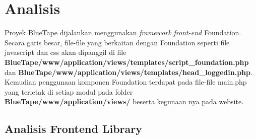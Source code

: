 

\chapter{Analisis}
Proyek BlueTape dijalankan menggunakan \textit{framework front-end}  Foundation. Secara garis besar, file-file yang berkaitan dengan Foundation seperti file javascript dan css akan dipanggil di file \textbf{BlueTape/www/application/views/templates/script{\_}foundation.php} dan \textbf{BlueTape/www/application/views/templates/head{\_}loggedin.php}. Kemudian penggunaan komponen Foundation terdapat pada file-file main.php yang terletak di setiap modul pada folder \textbf{BlueTape/www/application/views/} beserta kegunaan nya pada website.
\section{Analisis Frontend Library}
